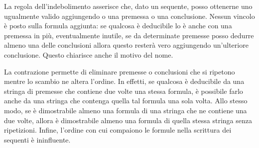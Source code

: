		La regola dell'indebolimento asserisce che, dato un sequente, posso ottenerne uno ugualmente valido aggiungendo o una premessa o una conclusione. Nessun vincolo è posto sulla formula aggiunta: se qualcosa è deducibile lo è anche con una premessa in più, eventualmente inutile, se da determinate premesse posso dedurre almeno una delle conclusioni allora questo resterà vero aggiungendo un'ulteriore conclusione. Questo chiarisce anche il motivo del nome.
		
		La contrazione permette di eliminare premesse o conclusioni che si ripetono mentre lo scambio ne altera l'ordine. In effetti, se qualcosa è deducibile da una stringa di premesse che contiene due volte una stessa formula, è possibile farlo anche da una stringa che contenga quella tal formula una sola volta. Allo stesso modo, se è dimostrabile almeno una formula di una stringa che ne contiene una due volte, allora è dimostrabile almeno una formula di quella stessa stringa senza ripetizioni. Infine, l'ordine con cui compaiono le formule nella scrittura dei sequenti è ininfluente. 
		
